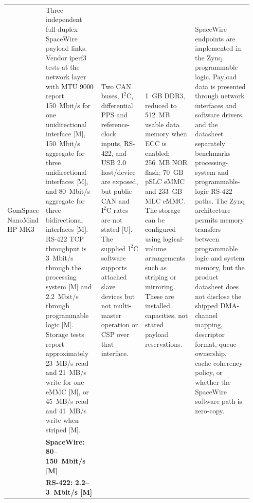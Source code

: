 \documentclass[10pt]{../datasheet}
\let\cite\citep
\begin{document}
\begin{landscape}
\begin{longtable}{|p{3.2cm}|p{4.5cm}|p{4.5cm}|p{4.5cm}|p{5.5cm}|}
    GomSpace NanoMind HP MK3 \cite{gomspace_nanomind_hp_mk3_ds}        &
    Three independent full-duplex SpaceWire payload links. Vendor iperf3 tests
    at the network layer with MTU 9000 report 150~Mbit/s for one unidirectional
    interface [M], 150~Mbit/s aggregate for three unidirectional interfaces [M],
    and 80~Mbit/s aggregate for three bidirectional interfaces [M]. RS-422 TCP
    throughput is 3~Mbit/s through the processing system [M] and 2.2~Mbit/s
    through programmable logic [M]. Storage tests report approximately 23~MB/s
    read and 21~MB/s write for one eMMC [M], or 45~MB/s read and 41~MB/s write
    when striped [M].                                                  &
    Two CAN buses, $\text{I}^2\text{C}$, differential PPS and reference-clock
    inputs, RS-422, and USB 2.0 host/device are exposed, but public CAN and
    $\text{I}^2\text{C}$ rates are not stated [U]. The supplied
    $\text{I}^2\text{C}$ software supports attached slave devices but not
    multi-master operation or CSP over that interface.                 &
    1~GB DDR3, reduced to 512~MB usable data memory when ECC is enabled; 256~MB
    NOR flash; 70~GB pSLC eMMC and 233~GB MLC eMMC. The storage can be
    configured using logical-volume arrangements such as striping or mirroring.
    These are installed capacities, not stated payload reservations.
                                                                       & SpaceWire endpoints are implemented in the Zynq programmable logic.
    Payload data is presented through network interfaces and software drivers,
    and the datasheet separately benchmarks processing-system and
    programmable-logic RS-422 paths. The Zynq architecture permits memory
    transfers between programmable logic and system memory, but the product
    datasheet does not disclose the shipped DMA-channel mapping, descriptor
    format, queue ownership, cache-coherency policy, or whether the SpaceWire
    software path is zero-copy.
    \\
    \cline{2-5}
                                                                       & \textbf{SpaceWire: 80--150~Mbit/s [M]}                                     &                                                  &                                           & \\
                                                                       & \textbf{RS-422: 2.2--3~Mbit/s [M]}                                         &                                                  &                                           & \\

\end{longtable}
\end{landscape}
\end{document}
